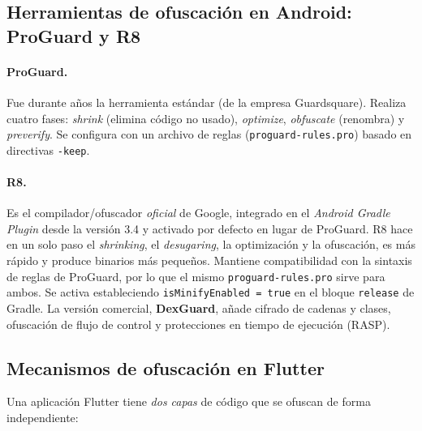 \documentclass[12pt,letterpaper]{article}
\begin{document}
\subsection{Herramientas de ofuscación en Android: ProGuard y R8}

\paragraph{ProGuard.} Fue durante años la herramienta estándar (de la empresa
Guardsquare). Realiza cuatro fases: \emph{shrink} (elimina código no usado),
\emph{optimize}, \emph{obfuscate} (renombra) y \emph{preverify}. Se configura
con un archivo de reglas (\texttt{proguard-rules.pro}) basado en directivas
\texttt{-keep}.

\paragraph{R8.} Es el compilador/ofuscador \emph{oficial} de Google, integrado en
el \emph{Android Gradle Plugin} desde la versión 3.4 y activado por defecto en
lugar de ProGuard. R8 hace en un solo paso el \emph{shrinking}, el
\emph{desugaring}, la optimización y la ofuscación, es más rápido y produce
binarios más pequeños. Mantiene compatibilidad con la sintaxis de reglas de
ProGuard, por lo que el mismo \texttt{proguard-rules.pro} sirve para ambos. Se
activa estableciendo \texttt{isMinifyEnabled = true} en el bloque \texttt{release}
de Gradle. La versión comercial, \textbf{DexGuard}, añade cifrado de cadenas y
clases, ofuscación de flujo de control y protecciones en tiempo de ejecución
(RASP).

\subsection{Mecanismos de ofuscación en Flutter}

Una aplicación Flutter tiene \emph{dos capas} de código que se ofuscan de forma
independiente:
\end{document}
